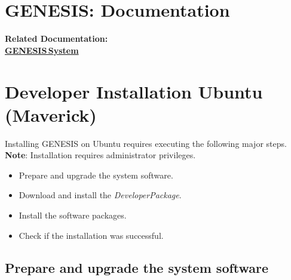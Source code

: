 \documentclass[12pt]{article}
\begin{document}
\section*{GENESIS: Documentation}

{\bf Related Documentation:} \\
\href{../genesis-system/genesis-system.tex}{\bf GENESIS\,System}

\section*{Developer Installation Ubuntu (Maverick)}

Installing GENESIS on Ubuntu requires executing the following major steps. {\bf Note}: Installation requires administrator privileges.
\begin{itemize}
   \item[] Prepare and upgrade the system software.
   \item[] Download and install the {\it DeveloperPackage}.
   \item[] Install the software packages.
   \item[] Check if the installation was successful. 
\end{itemize}

\subsection*{Prepare and upgrade the system software}
\end{document}
